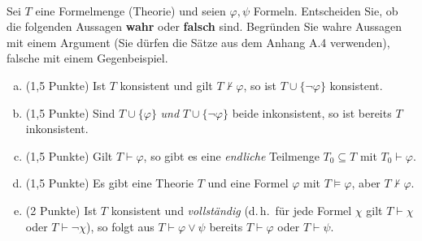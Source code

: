 \\
Sei $T$ eine Formelmenge (Theorie) und seien $\varphi,\psi$ Formeln. Entscheiden Sie, ob die folgenden Aussagen \textbf{wahr} oder \textbf{falsch} sind. Begründen Sie wahre Aussagen mit einem Argument (Sie dürfen die Sätze aus dem Anhang A.4 verwenden), falsche mit einem Gegenbeispiel.
\begin{enumerate}[a)]
  \item (1,5 Punkte) Ist $T$ konsistent und gilt $T \nvdash \varphi$, so ist $T \cup \{\neg\varphi\}$ konsistent.
  \item (1,5 Punkte) Sind $T \cup \{\varphi\}$ \emph{und} $T \cup \{\neg\varphi\}$ beide inkonsistent, so ist bereits $T$ inkonsistent.
  \item (1,5 Punkte) Gilt $T \vdash \varphi$, so gibt es eine \emph{endliche} Teilmenge $T_0 \subseteq T$ mit $T_0 \vdash \varphi$.
  \item (1,5 Punkte) Es gibt eine Theorie $T$ und eine Formel $\varphi$ mit $T \models \varphi$, aber $T \nvdash \varphi$.
  \item (2 Punkte) Ist $T$ konsistent und \emph{vollständig} (d.\,h.\ für jede Formel $\chi$ gilt $T\vdash\chi$ oder $T\vdash\neg\chi$), so folgt aus $T \vdash \varphi \vee \psi$ bereits $T \vdash \varphi$ oder $T \vdash \psi$.
\end{enumerate}


